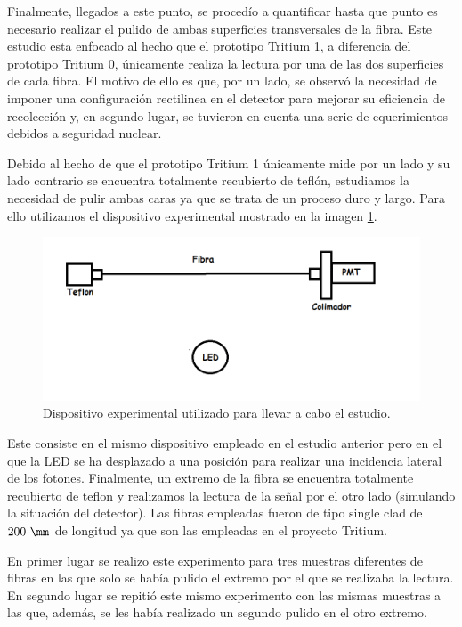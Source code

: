 Finalmente, llegados a este punto, se procedío a quantificar hasta que punto es necesario realizar el pulido de ambas superficies transversales de la fibra. Este estudio esta enfocado al hecho que el prototipo Tritium 1, a diferencia del prototipo Tritium 0, únicamente realiza la lectura por una de las dos superficies de cada fibra. El motivo de ello es que, por un lado, se observó la necesidad de imponer una configuración rectilinea en el detector para mejorar su eficiencia de recolección y, en segundo lugar, se tuvieron en cuenta una serie de  equerimientos debidos a seguridad nuclear. 

Debido al hecho de que el prototipo Tritium 1 únicamente mide por un lado y su lado contrario se encuentra totalmente recubierto de teflón, estudiamos la necesidad de pulir ambas caras ya que se trata de un proceso duro y largo. Para ello utilizamos el dispositivo experimental mostrado en la imagen \ref{setupcaras}.

\begin{figure}[hbtp]
\centering
\includegraphics[scale=0.7]{Figuras/SetUpLED.png}
\caption{Dispositivo experimental utilizado para llevar a cabo el estudio.\label{setupcaras}}
\end{figure}

Este consiste en el mismo dispositivo empleado en el estudio anterior pero en el que la LED se ha desplazado a una posición para realizar una incidencia lateral de los fotones. Finalmente, un extremo de la fibra se encuentra totalmente recubierto de teflon y realizamos la lectura de la señal por el otro lado (simulando la situación del detector). Las fibras empleadas fueron de tipo single clad de $200~\mm$ de longitud ya que son las empleadas en el proyecto Tritium.

En primer lugar se realizo este experimento para tres muestras diferentes de fibras en las que solo se había pulido el extremo por el que se realizaba la lectura. En segundo lugar se repitió este mismo experimento con las mismas muestras a las que, además, se les había realizado un segundo pulido en el otro extremo.

